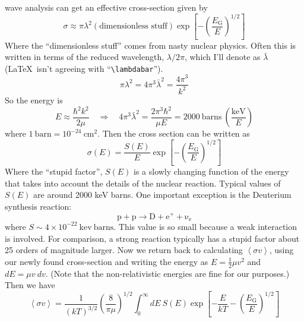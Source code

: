 \documentclass[10pt]{article}
\numberwithin{equation}{section}
\newcommand{\avg}[1]{\left\langle#1\right\rangle}
\begin{document}
  wave analysis can get an effective cross-section given by
  \begin{equation}
    \label{eq:123}
    \sigma \approx\pi\lambda^2\left(\textrm{dimensionless
    stuff}\right)\exp\left[-\left (\frac{E_\mathrm{G}}{E}\right)^{1/2}\right]
  \end{equation}
  Where the ``dimensionless stuff'' comes from nasty nuclear
  physics. Often this is written in terms of the reduced wavelength,
  $\lambda/2\pi$, which I'll denote as $\bar{\lambda}$ (\LaTeX\ isn't
  agreeing with ``\verb!\lambdabar!'').
  \begin{equation}
    \label{eq:124}
    \pi\lambda^2=4\pi^3\bar{\lambda}^2=\frac{4\pi^3}{k^2}
  \end{equation}
  So the energy is
  \begin{equation}
    \label{eq:125}
    E\approx \frac{\hbar^2k^2}{2\mu}\quad\Rightarrow\quad
    4\pi^3\bar{\lambda}^2=\frac{2\pi^3\hbar^2}{\mu E}=2000\
    \mathrm{barns}\ \left(\frac{\mathrm{keV}}{E}\right)
  \end{equation}
  where $1\ \mathrm{barn}=10^{-24}\ \mathrm{cm^2}$. Then the cross section can be written as
  \begin{equation}
    \label{eq:126}
    \sigma(E)=\frac{S(E)}{E}\exp\left[-\left(\frac{E_{\mathrm{G}}}{E}
\right)^{1/2}\right]
  \end{equation}
  Where the ``stupid factor'', $S(E)$ is a slowly changing function of
  the energy that takes into account the details of the nuclear
  reaction. Typical values of $S(E)$ are around 2000 keV barns. One
  important exception is the Deuterium synthesis reaction:
  \begin{equation}
    \label{eq:127}
    \mathrm{p+p\to D+e^++\nu_e}
  \end{equation}
  where $S\sim 4\times 10^{-22}\ \mathrm{kev\ barns}$. This value is
  so small because a weak interaction is involved. For comparison, a
  strong reaction typically has a stupid factor about 25 orders of
  magnitude larger. Now we return back
  to calculating $\avg{\sigma v}$, using our newly found cross-section
  and writing the energy as $E=\frac{1}{2}\mu v^2$ and $dE=\mu v\
  dv$. (Note that the non-relativistic energies are fine for our
  purposes.) Then we have
  \begin{equation}
    \label{eq:128}
    \avg{\sigma
      v}=\frac{1}{(kT)^{3/2}}\left(\frac{8}{\pi\mu}\right)^{1/2}\int_0^
\infty
    dE\ S(E)\exp\left[-\frac{E}{kT}-\left(\frac{E_\mathrm{G}}{E}\right)^
{1/2}\right]
  \end{equation}
\end{document}
